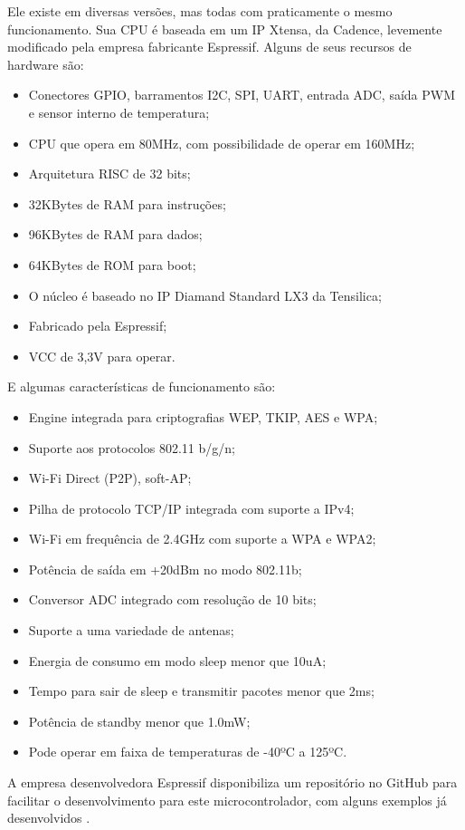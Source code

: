 Ele existe em diversas versões, mas todas com praticamente o mesmo funcionamento. Sua CPU é baseada em um IP Xtensa, da Cadence, levemente modificado pela empresa fabricante Espressif.
Alguns de seus recursos de hardware são:

\begin{itemize}
	\item Conectores GPIO, barramentos I2C, SPI, UART, entrada ADC, saída PWM e sensor interno de temperatura;
	\item CPU que opera em 80MHz, com possibilidade de operar em 160MHz;
	\item Arquitetura RISC de 32 bits;
	\item 32KBytes de RAM para instruções;
	\item 96KBytes de RAM para dados;
	\item 64KBytes de ROM para boot;
	\item O núcleo é baseado no IP Diamand Standard LX3 da Tensilica;
	\item Fabricado pela Espressif;
	\item VCC de 3,3V para operar.
\end{itemize}

E algumas características de funcionamento são:
\begin{itemize}	
	\item Engine integrada para criptografias WEP, TKIP, AES e WPA;
	\item Suporte aos protocolos 802.11 b/g/n;
	\item Wi-Fi Direct (P2P), soft-AP;
	
	\item Pilha de protocolo TCP/IP integrada com suporte a IPv4;
	\item Wi-Fi em frequência de 2.4GHz com suporte a WPA e WPA2;
	\item Potência de saída em +20dBm no modo 802.11b;
	
	\item Conversor ADC integrado com resolução de 10 bits;
	\item Suporte a uma variedade de antenas;
	\item Energia de consumo em modo sleep menor que 10uA;
	
	\item Tempo para sair de sleep e transmitir pacotes menor que 2ms;
	\item Potência de standby menor que 1.0mW;
	\item Pode operar em faixa de temperaturas de -40ºC a 125ºC.
	
\end{itemize}

A empresa desenvolvedora Espressif \cite{espressif_ref} disponibiliza um repositório no GitHub para facilitar o desenvolvimento para este microcontrolador, com alguns exemplos já desenvolvidos \cite{esp8266_site}.